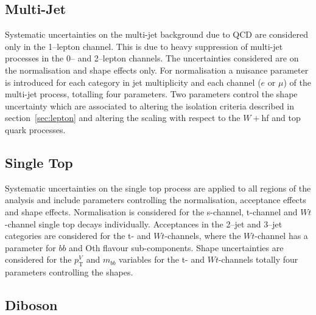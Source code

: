 \subsection{Multi-Jet}

Systematic uncertainties on the multi-jet background due to QCD are considered
only in the 1--lepton channel. This is due to heavy suppression of multi-jet
processes in the 0-- and 2--lepton channels. The uncertainties considered are on
the normalisation and shape effects only. For normalisation a nuisance parameter
is introduced for each category in jet multiplicity and each channel ($e$ or
$\mu$) of the multi-jet process, totalling four parameters. Two parameters
control the shape uncertainty which are associated to altering the isolation
criteria described in section~\ref{sec:lepton} and altering the scaling with
respect to the $W+$hf and top quark processes. 

\subsection{Single Top}

Systematic uncertainties on the single top process are applied to all regions of
the analysis and include parameters controlling the normalisation, acceptance
effects and shape effects. Normalisation is considered for the s-channel,
t-channel and $Wt$-channel single top decays individually. Acceptances in the
2--jet and 3--jet categories are considered for the t- and $Wt$-channels, where the
$Wt$-channel has a parameter for $bb$ and Oth flavour sub-components. Shape
uncertainties are considered for the $p_{\mathrm{T}}^V$ and $m_{bb}$ variables
for the t- and $Wt$-channels totally four parameters controlling the shapes.

\subsection{Diboson}


